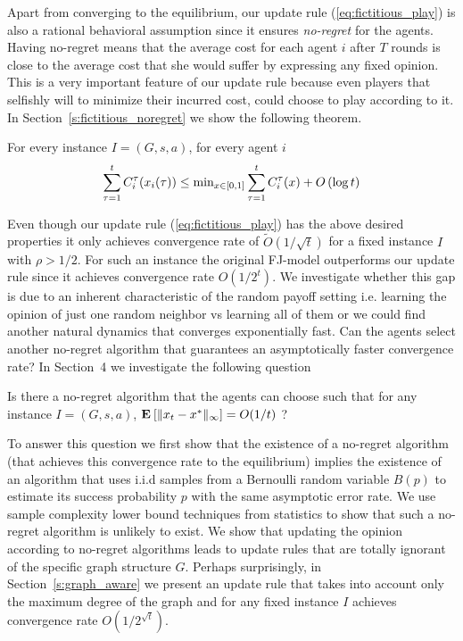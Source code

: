 Apart from converging to the equilibrium, our update rule
(\ref{eq:fictitious_play}) is also a rational behavioral
assumption since it ensures \emph{no-regret} for the agents.
Having no-regret means that the average cost for each agent $i$
after $T$ rounds is close to the average cost that she would
suffer by expressing any fixed opinion. This is a very important
feature of our update rule because even players that selfishly
will to minimize their incurred cost, could choose to play according
to it. In Section~\ref{s:fictitious_noregret} we show the following
theorem.
\begin{theorem}\label{t:fictitious_noregret}

  For every instance $I=(G,s,a)$, for every agent $i$
  $$\sum_{\tau=1}^tC_i^\tau(x_i(\tau)) \leq \text{min}_{x \in
    [0,1]}\sum_{\tau=1}^tC_i^\tau(x) + O\left(\log t\right)$$

\end{theorem}

Even though our update rule (\ref{eq:fictitious_play}) has the above
desired properties it only achieves convergence rate of
$\widetilde{O}(1/\sqrt{t})$ for a fixed instance $I$ with
$\rho>1/2$.  For such an instance the original FJ-model outperforms
our update rule since it achieves convergence rate $O(1/2^{t})$.
We investigate whether this gap is due to an inherent characteristic
of the random payoff setting i.e. learning the opinion of just one random
neighbor vs learning all of them or we could find another natural dynamics
that converges exponentially fast. Can the agents select another no-regret
algorithm that guarantees an asymptotically faster convergence rate?
In Section~4 we investigate the following question

\begin{question}
  Is there a no-regret algorithm that the agents can choose such that
  for any instance $I = (G, s, a)$, $\Exp{\norm{\infty}{x_t - x^*}} = O(1/t)$ ?
\end{question}

To answer this question we first show that the existence of a no-regret
algorithm (that achieves this convergence rate to the equilibrium) implies
the existence of an algorithm that uses i.i.d samples from a Bernoulli random
variable $B(p)$ to estimate its success probability $p$ with the same asymptotic
error rate. We use sample complexity lower bound techniques from statistics
to show that such a no-regret algorithm is unlikely to exist.
We show that updating the opinion according to no-regret algorithms leads
to update rules that are totally ignorant of the specific graph structure $G$.
Perhaps surprisingly, in Section~\ref{s:graph_aware} we present an update rule
that takes into account only the maximum degree of the graph and for any
fixed instance $I$ achieves convergence rate $O(1/2^{\sqrt{t}})$.

